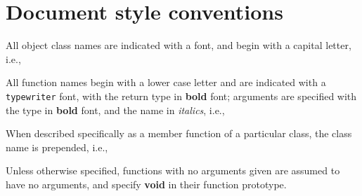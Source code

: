 
%
%
%

\section{Document style conventions}

\begin{enumerate}

All object class names are indicated with a 
font, and begin with a capital letter, i.e.,
\begin{center}
\end{center}

All function names begin with a lower case letter and are indicated
with a {\tt typewriter} font, with the return type in {\bf bold} font;
arguments are specified with the type in {\bf bold} font, and the name
in {\it italics}, i.e.,
\begin{center}
\end{center}
When described specifically as a member function of a particular
class, the class name is prepended, i.e.,
\begin{center}
\end{center}
Unless otherwise specified, functions with no arguments given are
assumed to have no arguments, and specify {\bf void} in their
function prototype.

\end{enumerate}
